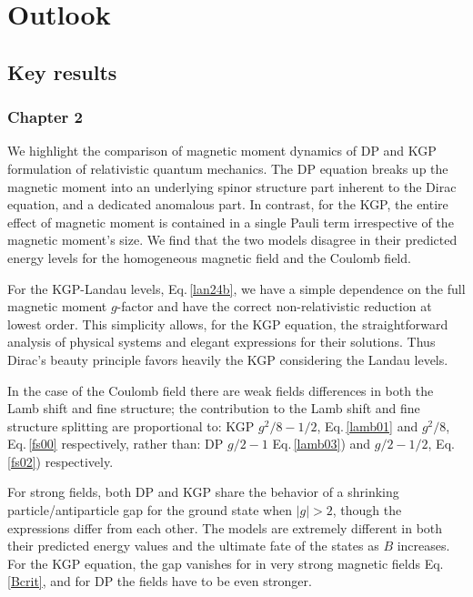 \chapter{Outlook}
\label{chap:outlook}

\section{Key results}
\label{sec:results}

\subsection{Chapter 2}
\label{sec:chap2}
We highlight the comparison of magnetic moment dynamics of DP and KGP formulation of relativistic quantum mechanics. The DP equation breaks up the magnetic moment into an underlying spinor structure part inherent to the Dirac equation, and a dedicated anomalous part. In contrast, for the KGP, the entire effect of magnetic moment is contained in a single Pauli term irrespective of the magnetic moment\rq s size. We find that the two models disagree in their predicted energy levels for the homogeneous magnetic field and the Coulomb field.

For the KGP-Landau levels, Eq.\,\eqref{lan24b}, we have a simple dependence on the full magnetic moment $g$-factor and have the correct non-relativistic reduction at lowest order. This simplicity allows, for the KGP equation, the straightforward analysis of physical systems and elegant expressions for their solutions. Thus Dirac's beauty principle favors heavily the KGP considering the Landau levels.

In the case of the Coulomb field there are weak fields differences in both the Lamb shift and fine structure; the contribution to the Lamb shift and fine structure splitting are proportional to: KGP $g^{2}/8-1/2$, Eq.\,\eqref{lamb01} and $g^{2}/8$, Eq.\,\eqref{fs00} respectively, rather than: DP $g/2-1$ Eq.\,\eqref{lamb03}) and $g/2-1/2$, Eq.\,\eqref{fs02}) respectively.

For strong fields, both DP and KGP share the behavior of a shrinking particle/antiparticle gap for the ground state when $|g|>2$, though the expressions differ from each other. The models are extremely different in both their predicted energy values and the ultimate fate of the states as $B$ increases. For the KGP equation, the gap vanishes for in very strong magnetic fields Eq.\,\eqref{Bcrit}, and for DP the fields have to be even stronger.

